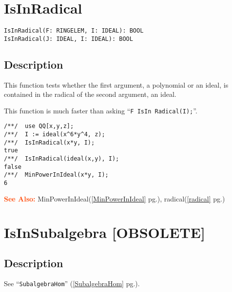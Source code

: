 \documentclass[a4paper]{mybook}
\newenvironment{command}{}{} %
\newcommand\SeeAlso{\par\textcolor{OrangeRed}{\textbf{\large See Also: }}}
\begin{document}
\section{IsInRadical}
\label{IsInRadical}
\begin{command} %


\begin{Verbatim}[label=syntax, rulecolor=\color{MidnightBlue},
frame=single]
IsInRadical(F: RINGELEM, I: IDEAL): BOOL
IsInRadical(J: IDEAL, I: IDEAL): BOOL
\end{Verbatim}


\subsection*{Description}

This function tests whether the first argument, a polynomial or an
ideal, is contained in the radical of the second argument, an ideal.
\par 
This function is much faster than asking ``\verb&F IsIn Radical(I);&''.
\begin{Verbatim}[label=example, rulecolor=\color{PineGreen}, frame=single]
/**/  use QQ[x,y,z];
/**/  I := ideal(x^6*y^4, z);
/**/  IsInRadical(x*y, I);
true
/**/  IsInRadical(ideal(x,y), I);
false
/**/  MinPowerInIdeal(x*y, I);
6
\end{Verbatim}


\SeeAlso %
  MinPowerInIdeal(\ref{MinPowerInIdeal} pg.\pageref{MinPowerInIdeal}), 
    radical(\ref{radical} pg.\pageref{radical})
\end{command} %

\section{IsInSubalgebra [OBSOLETE]}
\label{IsInSubalgebra [OBSOLETE]}
\begin{command} %



\subsection*{Description}

See ``\verb&SubalgebraHom&'' (\ref{SubalgebraHom} pg.\pageref{SubalgebraHom}).

\end{command} %
\end{document}
